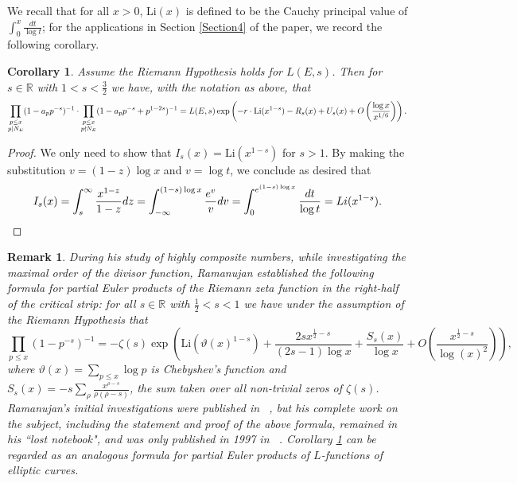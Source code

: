 \documentclass[12pt,reqno]{amsart}
\newtheorem{corollary}[theorem]{Corollary}
\newtheorem{remark}[theorem]{Remark}
\theoremstyle{definition}
\numberwithin{equation}{section}
\newcommand{\Li}{\mathrm{Li}}
\begin{document}
We recall that for all $x >0 $, $\Li(x)$ is defined to be the Cauchy principal value of $\int_{0}^x \frac{dt}{\log t}$; 
for the applications in Section \ref{Section4} of the paper, we record the following corollary. 


\begin{corollary} \label{ramanujancor}
Assume the Riemann Hypothesis holds for $L(E, s)$. Then for  $s \in \mathbb R$ with $1< s < \frac{3}{2}$  we have, with the notation as above, that 
\begin{equation*}
\prod_ {\substack{p \leq x \\ p | N_E}}(1-a_pp^{-s})^{-1} \cdot  \prod_ {\substack{p \leq x \\ p \nmid N_E}} (1-a_pp^{-s}+p^{1-2s})^{-1}  = L(E, s)  \exp \left (-r \cdot \Li(x^{1-s}) - R_s(x) 
+  U_s(x)+ O \left ( \frac{\log x}{x^{1/6}} \right ) \right).   \\
\end{equation*}
\end{corollary}

\begin{proof}
We only need to show that $I_s(x)=\Li(x^{1-s})$ for $s >1$. By making the substitution $v=(1-z) \log x$ and $v=\log t$, we conclude as desired that 
\begin{equation*}
I_s(x) = \int_{s}^{\infty} \frac{x^{1-z}}{1-z} dz = \int_{-\infty}^{ (1-s) \log x} \frac{e^v}{v} dv = \int_{0}^{e^{(1-s) \log x}} \frac{dt}{\log t} = \textrm{Li}(x^{1-s}).  \qedhere
\end{equation*}

\end{proof}



\begin{remark} \label{Ramanujan}
During his study of highly composite numbers,  while investigating the maximal order of the divisor function, Ramanujan established the following formula for partial Euler products of the Riemann zeta function in the right-half of the critical strip:  for all $s \in \mathbb R$ with $\frac{1}{2} < s < 1$ we have under the assumption of the Riemann Hypothesis that 
$$
\prod_{p \leq x} (1-p^{-s})^{-1} = -\zeta(s) \exp \left (  \Li (\vartheta(x)^{1-s}) +  \frac{ 2s x^{\frac{1}{2}-s}}{(2s-1) \log x }+\frac{S_s(x)}{\log x} + O \left ( \frac{x^{\frac{1}{2}-s}}{ \log (x)^2} \right) \right), 
$$
where $\vartheta(x)=\sum \limits _{p \leq x} \log p$ is Chebyshev's function and 
$
S_s(x) = - s \sum \limits_{ \rho } \frac{x^{\rho-s}}{ \rho(\rho-s)}$, the sum taken over all non-trivial zeros of $\zeta(s)$. Ramanujan's initial investigations  were published in ~\cite{Ramanujan1915}, but his complete work on the subject, including the statement and proof of the above formula, remained in his ``lost notebook",  and was only published in 1997 in ~\cite{Ramanujan1997}. Corollary \ref{ramanujancor} can be regarded as an analogous formula for partial Euler products of $L$-functions of elliptic curves. 
\end{remark}
\end{document}
